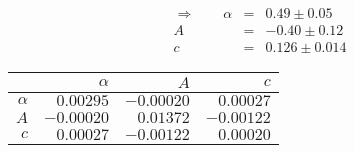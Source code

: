 \begin{align}\Rightarrow \qquad
    \alpha &=& 0.49 \pm 0.05 \\
    A &=& -0.40 \pm 0.12 \\
    c &=& 0.126 \pm 0.014 
\end{align}

 \begin{tabular}{|r|r|r|r|}
 \hline 
\cellcolor{tabcolor}&\cellcolor{tabcolor}$\alpha$&\cellcolor{tabcolor}$A$&\cellcolor{tabcolor}$c$\\ \hline 
 \cellcolor{tabcolor}$\alpha$&$0.00295$ &$-0.00020$ &$0.00027$ \\ \hline
\cellcolor{tabcolor}$A$&$-0.00020$ &$0.01372$ &$-0.00122$ \\ \hline
\cellcolor{tabcolor}$c$&$0.00027$ &$-0.00122$ &$0.00020$ \\ \hline
\end{tabular}
